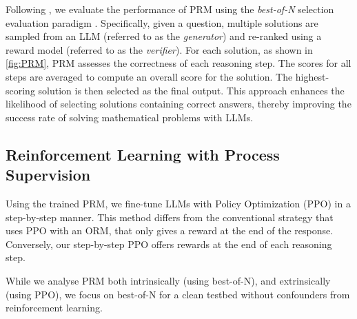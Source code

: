 Following \citet{multiorm,prm800k,shepherd}, we evaluate the performance of PRM using the \textit{best-of-N} selection evaluation paradigm \citep{bestofn1,bestofn2}. Specifically, given a question, multiple solutions are sampled from an LLM (referred to as the \textit{generator}) and re-ranked using a reward model (referred to as the \textit{verifier}). For each solution, as shown in \autoref{fig:PRM}, PRM assesses the correctness of each reasoning step. The scores for all steps are averaged to compute an overall score for the solution. The highest-scoring solution is then selected as the final output. This approach enhances the likelihood of selecting solutions containing correct answers, thereby improving the success rate of solving mathematical problems with LLMs.

\subsection{Reinforcement Learning with Process Supervision}

Using the trained PRM, we fine-tune LLMs with Policy Optimization (PPO) \citep{ppo} in a step-by-step manner. This method differs from the conventional strategy that uses PPO with an ORM, that only gives a reward at the end of the response. Conversely, our step-by-step PPO offers rewards at the end of each reasoning step. 

While we analyse PRM both intrinsically (using best-of-N), and extrinsically (using PPO), we focus on best-of-N for a clean testbed without confounders from reinforcement learning.